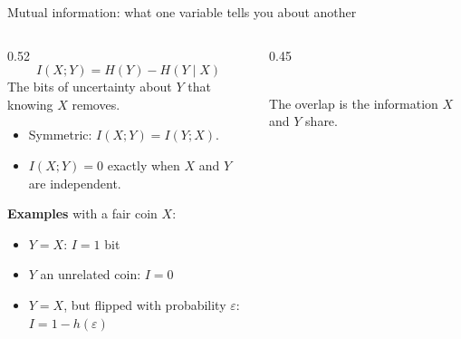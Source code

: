 \documentclass[aspectratio=169,11pt,xcolor={table}]{beamer}
\newcommand{\aside}[1]{{\color{muted}\small #1}}
\begin{document}
\begin{frame}{Mutual information: what one variable tells you about another}
  \begin{columns}[c]
    \begin{column}{0.52\textwidth}
      \[ I(X;Y) = H(Y) - H(Y \mid X) \]
      The bits of uncertainty about $Y$ that knowing $X$ removes.
      \begin{itemize}
        \item Symmetric: $I(X;Y) = I(Y;X)$.
        \item $I(X;Y) = 0$ exactly when $X$ and $Y$ are independent.
      \end{itemize}
      \medskip
      \textbf{Examples} with a fair coin $X$:
      \begin{itemize}
        \item $Y = X$: \quad $I = 1$ bit
        \item $Y$ an unrelated coin: \quad $I = 0$
        \item $Y = X$, but flipped with probability $\varepsilon$: \quad $I = 1 - h(\varepsilon)$
      \end{itemize}
    \end{column}
    \begin{column}{0.45\textwidth}
      \centering
      \\[1mm]
      \aside{The overlap is the information $X$ and $Y$ share.}
    \end{column}
  \end{columns}
\end{frame}
\end{document}
